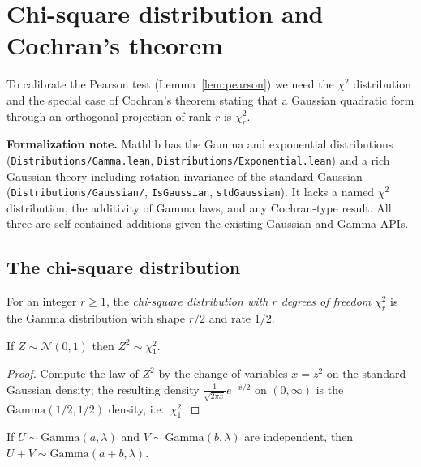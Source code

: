 \chapter{Chi-square distribution and Cochran's theorem}
\label{chap:pre_cochran}

To calibrate the Pearson test (Lemma~\ref{lem:pearson}) we need the $\chi^2$
distribution and the special case of Cochran's theorem stating that a Gaussian
quadratic form through an orthogonal projection of rank $r$ is $\chi^2_r$.

\textbf{Formalization note.} Mathlib has the Gamma and exponential distributions
(\texttt{Distributions/Gamma.lean}, \texttt{Distributions/Exponential.lean}) and
a rich Gaussian theory including rotation invariance of the standard Gaussian
(\texttt{Distributions/Gaussian/}, \texttt{IsGaussian}, \texttt{stdGaussian}). It
lacks a named $\chi^2$ distribution, the additivity of Gamma laws, and any
Cochran-type result. All three are self-contained additions given the existing
Gaussian and Gamma APIs.

\section{The chi-square distribution}
\label{sec:pre_chisq_def}

\begin{definition}\label{def:chiSquared}
For an integer $r\ge1$, the \emph{chi-square distribution with $r$ degrees of
freedom} $\chi^2_r$ is the Gamma distribution with shape $r/2$ and rate $1/2$.
\end{definition}

\begin{lemma}\label{lem:sq_gaussian_chisq1}
If $Z\sim\mathcal{N}(0,1)$ then $Z^2\sim\chi^2_1$.
\end{lemma}

\begin{proof}
Compute the law of $Z^2$ by the change of variables $x = z^2$ on the standard
Gaussian density; the resulting density $\frac{1}{\sqrt{2\pi x}}e^{-x/2}$ on
$(0,\infty)$ is the $\mathrm{Gamma}(1/2,1/2)$ density, i.e.\ $\chi^2_1$.
\end{proof}

\begin{lemma}\label{lem:gamma_add}
If $U\sim\mathrm{Gamma}(a,\lambda)$ and $V\sim\mathrm{Gamma}(b,\lambda)$ are
independent, then $U+V\sim\mathrm{Gamma}(a+b,\lambda)$.
\end{lemma}

